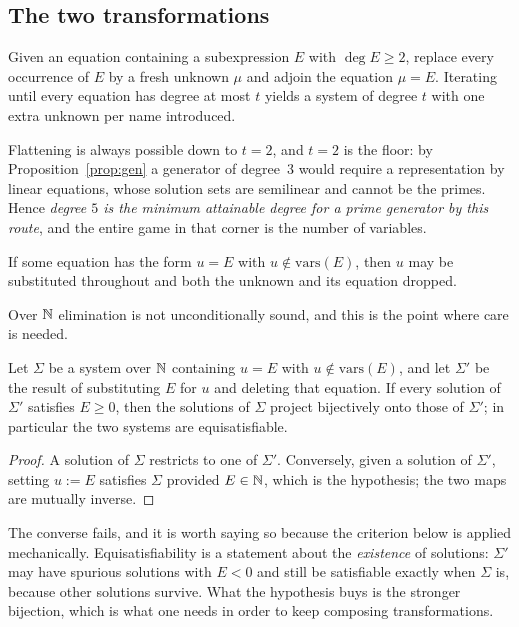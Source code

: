 \subsection{The two transformations}

\begin{definition}[Flattening]
Given an equation containing a subexpression $E$ with $\deg E\ge 2$, replace
every occurrence of $E$ by a fresh unknown $\mu$ and adjoin the equation
$\mu=E$. Iterating until every equation has degree at most $t$ yields a system
of degree $t$ with one extra unknown per name introduced.
\end{definition}

Flattening is always possible down to $t=2$, and $t=2$ is the floor: by
Proposition~\ref{prop:gen} a generator of degree~$3$ would require a
representation by linear equations, whose solution sets are semilinear and
cannot be the primes. Hence \emph{degree $5$ is the minimum attainable degree
for a prime generator by this route}, and the entire game in that corner is the
number of variables.

\begin{definition}[Elimination]
If some equation has the form $u=E$ with $u\notin\mathrm{vars}(E)$, then $u$ may
be substituted throughout and both the unknown and its equation dropped.
\end{definition}

Over $\mathbb{N}$ elimination is not unconditionally sound, and this is the point where
care is needed.

\begin{proposition}
\label{prop:elim}
Let $\Sigma$ be a system over $\mathbb{N}$ containing $u=E$ with
$u\notin\mathrm{vars}(E)$, and let $\Sigma'$ be the result of substituting $E$
for $u$ and deleting that equation. If every solution of $\Sigma'$ satisfies
$E\ge 0$, then the solutions of $\Sigma$ project bijectively onto those of
$\Sigma'$; in particular the two systems are equisatisfiable.
\end{proposition}

\begin{proof}
A solution of $\Sigma$ restricts to one of $\Sigma'$. Conversely, given a
solution of $\Sigma'$, setting $u:=E$ satisfies $\Sigma$ provided $E\in\mathbb{N}$,
which is the hypothesis; the two maps are mutually inverse.
\end{proof}

\begin{remark}
The converse fails, and it is worth saying so because the criterion below is
applied mechanically. Equisatisfiability is a statement about the
\emph{existence} of solutions: $\Sigma'$ may have spurious solutions with $E<0$
and still be satisfiable exactly when $\Sigma$ is, because other solutions
survive. What the hypothesis buys is the stronger bijection, which is what one
needs in order to keep composing transformations.
\end{remark}

